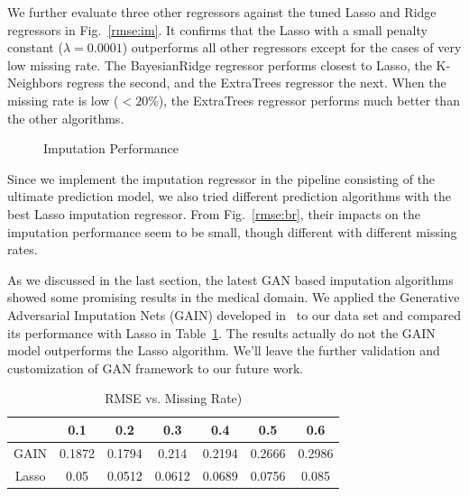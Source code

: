 We further evaluate three other regressors against the tuned Lasso and Ridge regressors in Fig.~\ref{rmse:im}. It confirms that the Lasso with a small 
penalty constant ($\lambda = 0.0001$) outperforms all other regressors except for the cases of very low missing rate. The BayesianRidge regressor performs 
closest to Lasso, the K-Neighbors regress the second, and the ExtraTrees regressor the next. When the missing rate is low ($<20\%$), the ExtraTrees regressor 
performs much better than the other algorithms.

  \begin{figure}[!ht]
    \hfill
    \caption{Imputation Performance}
    \label{fig:rmse}
  \end{figure}

Since we implement the imputation regressor in the pipeline consisting of the ultimate prediction model, we also tried different prediction algorithms 
with the best Lasso imputation regressor. From Fig.~\ref{rmse:br}, their impacts on the imputation performance seem to be small, though different 
with different missing rates.
 
As we discussed in the last section, the latest GAN based imputation algorithms showed some promising results in the medical domain. 
We applied the Generative Adversarial Imputation Nets (GAIN) developed in~\cite{Yoon2018GAINMD} to our data set and compared its performance 
with Lasso in Table~\ref{tab:gain}. The results actually do not the GAIN model outperforms the Lasso algorithm. We'll leave the further validation and 
customization of GAN framework to our future work.
  
 \begin{table}[!ht]
\caption{RMSE vs. Missing Rate) }
\label{tab:gain}
\begin{center}
\begin{tabular}{ |c|c|c|c|c|c|c| } 
 \hline
  & 0.1 & 0.2 & 0.3 & 0.4 & 0.5 & 0.6\\ 
 \hline
  \hline
 GAIN & 0.1872 & 0.1794 & 0.214 & 0.2194 & 0.2666 & 0.2986 \\ 
 \hline
 Lasso & 0.05 & 0.0512 & 0.0612 & 0.0689 &0.0756 & 0.085\\
 \hline
\end{tabular}
\end{center}
\end{table} 

